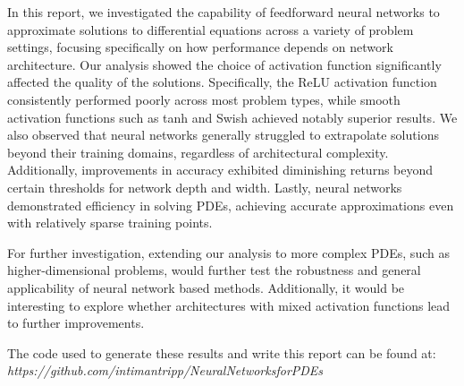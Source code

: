 In this report, we investigated the capability of feedforward neural networks to approximate solutions 
to differential equations across a variety of problem settings, focusing specifically on how 
performance depends on network architecture. Our analysis showed the choice of activation 
function significantly affected the quality of the solutions. Specifically, the
ReLU activation function consistently performed poorly across most problem types, while smooth activation 
functions such as tanh and Swish achieved notably superior results. We also observed that neural 
networks generally struggled to extrapolate solutions beyond their training domains, regardless 
of architectural complexity. Additionally, improvements in accuracy exhibited diminishing returns 
beyond certain thresholds for network depth and width. Lastly, neural networks demonstrated 
efficiency in solving PDEs, achieving accurate approximations even with relatively 
sparse training points.

For further investigation, extending our analysis to more complex 
PDEs, such as higher-dimensional problems, would further test the robustness and 
general applicability of neural network based methods. Additionally, it would be interesting to
explore whether architectures with mixed activation functions lead to further improvements.

The code used to generate these results and write this report can be found at:
\textit{https://github.com/intimantripp/NeuralNetworksforPDEs}